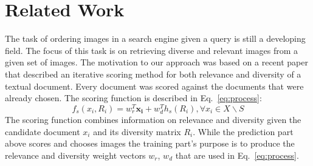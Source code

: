 \documentclass{sig-alternate}
\begin{document}
{\section{Related Work}
The task of ordering images in a search engine given a query is
still a developing field.  The focus of this
task is on retrieving diverse and relevant images from a given set of images.
The motivation to our approach was based on a recent paper \cite{fscore} that 
described an iterative scoring method for both relevance and diversity of 
a textual document. Every document was scored against the documents that were already 
chosen. The scoring function is described in Eq.~\ref{eq:process}:
\begin{equation}
f_{s}(x_{i},R_{i})=w_{r}^{T}\mathbf{x_{i}+}w_{d}^{T}h_{s}(R_{i}),\forall x_{i}\in X\backslash S\label{eq:process}
\end{equation}
The scoring function combines information on relevance and diversity given the candidate document $x_{i}$ and its
diversity matrix $R_{i}$. 
While the prediction part above scores and chooses images the training part's purpose is
to produce the relevance and diversity weight vectors $w_{r}$, $w_{d}$ that are used in Eq.~\ref{eq:process}.



}
\end{document}
